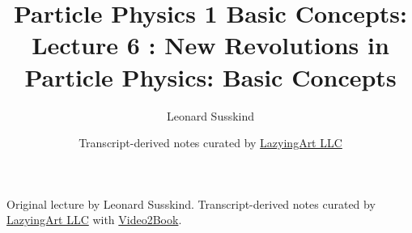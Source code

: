 \documentclass[11pt,oneside]{book}
\begin{document}
\frontmatter
\title{Particle Physics 1 Basic Concepts: Lecture 6 : New Revolutions in Particle Physics: Basic Concepts}
\author{Leonard Susskind}
\date{Transcript-derived notes curated by \href{https://lazying.art}{LazyingArt LLC}}
\maketitle
\begin{center}
\small Original lecture by Leonard Susskind. Transcript-derived notes curated by \href{https://lazying.art}{LazyingArt LLC} with \href{https://github.com/lachlanchen/Video2Book}{Video2Book}.
\end{center}
\clearpage
\mainmatter

\end{document}
